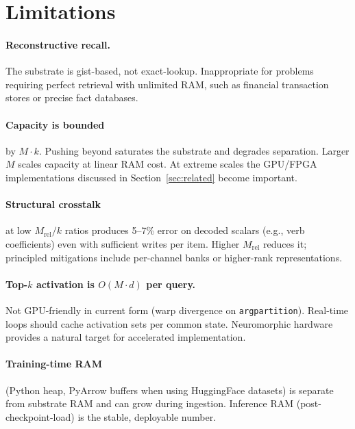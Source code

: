 \documentclass[11pt,a4paper]{article}
\begin{document}
\section{Limitations}
\label{sec:limits}

\paragraph{Reconstructive recall.}  The substrate is gist-based, not
exact-lookup.  Inappropriate for problems requiring perfect retrieval
with unlimited RAM, such as financial transaction stores or precise
fact databases.

\paragraph{Capacity is bounded} by $M \cdot k$.  Pushing beyond
saturates the substrate and degrades separation.  Larger $M$ scales
capacity at linear RAM cost.  At extreme scales the GPU/FPGA
implementations discussed in Section~\ref{sec:related} become important.

\paragraph{Structural crosstalk} at low $M_{\mathrm{rel}}/k$ ratios
produces 5--7\% error on decoded scalars (e.g., verb coefficients) even
with sufficient writes per item.  Higher $M_{\mathrm{rel}}$ reduces it;
principled mitigations include per-channel banks or higher-rank
representations.

\paragraph{Top-$k$ activation is $O(M \cdot d)$ per query.}  Not
GPU-friendly in current form (warp divergence on
\texttt{argpartition}).  Real-time loops should cache activation sets
per common state.  Neuromorphic hardware
\cite{indiveri2011neuromorphic,merolla2014million,davies2018loihi}
provides a natural target for accelerated implementation.

\paragraph{Training-time RAM} (Python heap, PyArrow buffers when using
HuggingFace datasets) is separate from substrate RAM and can grow
during ingestion.  Inference RAM (post-checkpoint-load) is the stable,
deployable number.
\end{document}

